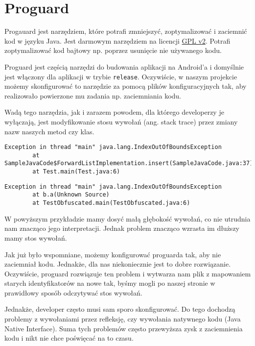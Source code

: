 \documentclass[12pt,a4paper,leqno,oneside,titlepage]{book}
\begin{document}
\section{Proguard}
Progauard jest narzędziem, które potrafi zmniejszyć, zoptymalizować i zaciemnić kod w języku Java. Jest darmowym narzędziem na licencji \href{https://en.wikipedia.org/wiki/GNU_General_Public_License#Version_2}{GPL v2}. Potrafi zoptymalizować kod bajtowy np. poprzez usunięcie nie używanego kodu.
\par Proguard jest częścią narzędzi do budowania aplikacji na Android'a i domyślnie jest włączony dla aplikacji w trybie \verb|release|. Oczywiście, w naszym projekcie możemy skonfigurować to narzędzie za pomocą plików konfiguracyjnych tak, aby realizowało powierzone mu zadania np. zaciemniania kodu.\par
Wadą tego narzędzia, jak i zarazem powodem, dla którego developerzy je wyłączają, jest modyfikowanie stosu wywołań (ang. stack trace) przez zmiany nazw naszych metod czy klas.
%
\begin{lstlisting}[caption={Przykładowy wyjątek dla nie zaciemnionego kodu.}]
Exception in thread "main" java.lang.IndexOutOfBoundsException
        at SampleJavaCode$ForwardListImplementation.insert(SampleJavaCode.java:37)
        at Test.main(Test.java:6)
\end{lstlisting}
%
\begin{lstlisting}[caption={Przykładowy wyjątek dla kodu który został zaciemniony.}]
Exception in thread "main" java.lang.IndexOutOfBoundsException
        at b.a(Unknown Source)
        at TestObfuscated.main(TestObfuscated.java:6)
\end{lstlisting}
%
W powyższym przykładzie mamy dosyć małą głębokość wywołań, co nie utrudnia nam znacząco jego interpretacji. Jednak problem znacząco wzrasta im dłuższy mamy stos wywołań.\par
Jak już było wspomniane, możemy konfigurować proguarda tak, aby nie zaciemniał kodu. Jednakże, dla nas niekoniecznie jest to dobre rozwiązanie. Oczywiście, proguard rozwiązuje ten problem i wytwarza nam plik z mapowaniem starych identyfikatorów na nowe tak, byśmy mogli po naszej stronie w prawidłowy sposób odczytywać stos wywołań.
%

%
\par
Jednakże, developer często musi sam sporo skonfigurować. Do tego dochodzą problemy z wywołaniami przez refleksję, czy wywołania natywnego kodu (Java Native Interface). Suma tych problemów często przewyższa zysk z zaciemnienia kodu i nikt nie chce poświęcać na to czasu.
\end{document}
